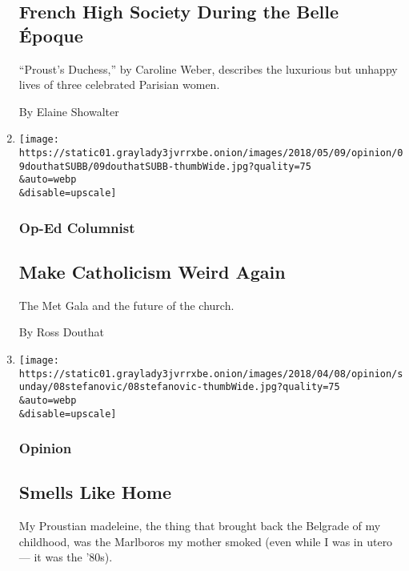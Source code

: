 \begin{enumerate}
  \hypertarget{french-high-society-during-the-belle-uxe9poque}{%
  \subsection{French High Society During the Belle
  Époque}\label{french-high-society-during-the-belle-uxe9poque}}

  ``Proust's Duchess,'' by Caroline Weber, describes the luxurious but
  unhappy lives of three celebrated Parisian women.

  By Elaine Showalter
\item
  \href{/2018/05/08/opinion/met-gala-catholic-church.html}{}

  \texttt{[image: https://static01.graylady3jvrrxbe.onion/images/2018/05/09/opinion/09douthatSUBB/09douthatSUBB-thumbWide.jpg?quality=75\\\&auto=webp\\\&disable=upscale]}

  \hypertarget{op-ed-columnist}{%
  \subsubsection{Op-Ed Columnist}\label{op-ed-columnist}}

  \hypertarget{make-catholicism-weird-again}{%
  \subsection{Make Catholicism Weird
  Again}\label{make-catholicism-weird-again}}

  The Met Gala and the future of the church.

  By Ross Douthat
\item
  \href{/2018/04/07/opinion/sunday/smells-like-home.html}{}

  \texttt{[image: https://static01.graylady3jvrrxbe.onion/images/2018/04/08/opinion/sunday/08stefanovic/08stefanovic-thumbWide.jpg?quality=75\\\&auto=webp\\\&disable=upscale]}

  \hypertarget{opinion}{%
  \subsubsection{Opinion}\label{opinion}}

  \hypertarget{smells-like-home}{%
  \subsection{Smells Like Home}\label{smells-like-home}}

  My Proustian madeleine, the thing that brought back the Belgrade of my
  childhood, was the Marlboros my mother smoked (even while I was in
  utero --- it was the '80s).


\end{enumerate}
